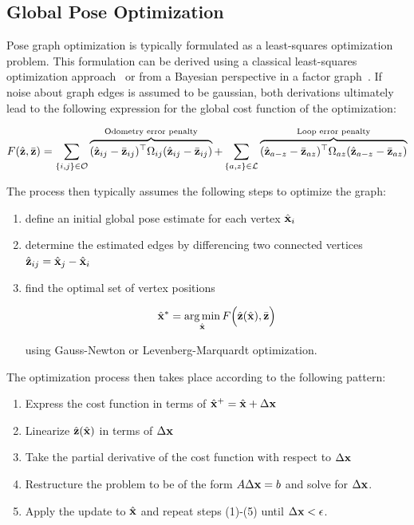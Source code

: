 \subsection{Global Pose Optimization}


Pose graph optimization is typically formulated as a least-squares optimization problem.  This formulation can be derived using a classical least-squares optimization approach~\cite{Kummerle2011} or from a Bayesian perspective in a factor graph~\cite{Kaess2008}.  If noise about graph edges is assumed to be gaussian, both derivations ultimately lead to the following expression for the global cost function of the optimization:

\begin{align}
  F(\hat{\mathbf{z}},\bar{\mathbf{z}}) = \sum_{\{i,j\} \in \mathcal{O}} \overbrace{(\hat{\mathbf{z}}_{ij}-\bar{\mathbf{z}}_{ij})^\top\Omega_{ij}(\hat{\mathbf{z}}_{ij}-\bar{\mathbf{z}}_{ij})}^\text{Odometry error penalty} + \sum_{\{a,z\} \in \mathcal{L}} \overbrace{ (\hat{\mathbf{z}}_{a-z}-\bar{\mathbf{z}}_{az})^\top \Omega_{az} (\hat{\mathbf{z}}_{a-z}-\bar{\mathbf{z}}_{az}) }^\text{Loop error penalty}
  \label{eqn:cost_function}
\end{align}

The process then typically assumes the following steps to optimize the graph:

\begin{enumerate}
  \item define an initial global pose estimate for each vertex $\hat{\mathbf{x}}_i$
  \item determine the estimated edges by differencing two connected vertices $\hat{\mathbf{z}}_{ij} = \hat{\mathbf{x}}_j - \hat{\mathbf{x}}_i$
  \item find the optimal set of vertex positions

  \begin{align}
      \hat{\mathbf{x}}^* = \operatorname*{arg\,min}_{\hat{\mathbf{x}}} F\Big(\hat{\mathbf{z}}(\hat{\mathbf{x}}),\bar{\mathbf{z}} \Big)
	     \label{eqn:global_opt}
	\end{align}


   using Gauss-Newton or Levenberg-Marquardt optimization.
\end{enumerate}

The optimization process then takes place according to the following pattern:
\begin{enumerate}
	\item Express the cost function in terms of $\hat{\mathbf{x}}^+ = \hat{\mathbf{x}} + \Delta\mathbf{x}$
	\item Linearize $\hat{\mathbf{z}}(\hat{\mathbf{x}})$ in terms of $\Delta\mathbf{x}$
	\item Take the partial derivative of the cost function with respect to $\Delta\mathbf{x}$
	\item Restructure the problem to be of the form $A \Delta \mathbf{x} = b$ and solve for $\Delta\mathbf{x}$.
	\item Apply the update to $\hat{\mathbf{x}}$ and repeat steps (1)-(5) until $\Delta\mathbf{x} < \epsilon$.
 \end{enumerate}

